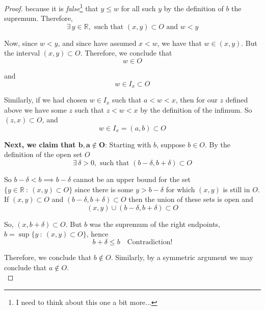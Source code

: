 \documentclass[12pt]{article}
\newlength\tindent
\renewcommand{\indent}{\hspace*{\tindent}}
\newcommand{\R}{\mathbb R}
\begin{document}
\begin{proof}
because it is {\em false}\footnote{I need to think about this one a bit more...} that $y \leq w$ for all such $y$ by the definition of $b$ the supremum. Therefore,
\begin{equation*}
	\exists\,y\in\R, \text{ such that } (x,y) \subset O \text{ and } w < y
\end{equation*}

\indent Now, since $w < y$, and since have assumed $x < w$, we have that $w \in (x, y)$. But the interval $(x, y) \subset O$. Therefore, we conclude that
\begin{equation*}
	w \in O
\end{equation*}

and
\begin{equation*}
	w \in I_x \subset O
\end{equation*}

\indent Similarly, if we had chosen $w \in I_x$ such that $a < w < x$, then for our $z$ defined above we have some $z$ such that $z < w < x$ by the definition of the infimum. So $(z, x) \subset O$, and
\begin{equation*}
	w \in I_x = (a,b) \subset O
\end{equation*}

{\bf Next, we claim that $\bm{b, a \notin O}$}: Starting with $b$, suppose $b \in O$. By the definition of the open set $O$
\begin{equation*}
	\exists\,\delta > 0, \text{ such that } (b - \delta, b + \delta) \subset O
\end{equation*}

\indent So $b - \delta < b \implies b - \delta$ cannot be an upper bound for the set $\{y\in\R~:~(x,y)\subset O\}$ since there is some $y > b - \delta$ for which $(x, y)$ is still in $O$. If $(x, y) \subset O$ and $(b - \delta, b + \delta) \subset O$ then the union of these sets is open and
\begin{equation*}
	(x, y) \cup (b - \delta, b + \delta) \subset O
\end{equation*}

So, $(x, b + \delta) \subset O$. But $b$ was the supremum of the right endpoints, $b = \sup\{y~:~(x,y) \subset O\}$, hence
\begin{equation*}
	b + \delta \leq b \quad \text{Contradiction!}
\end{equation*}

\indent Therefore, we conclude that $b \notin O$. Similarly, by a symmetric argument we may conclude that $a\notin O$. \\


\end{proof}
\end{document}
